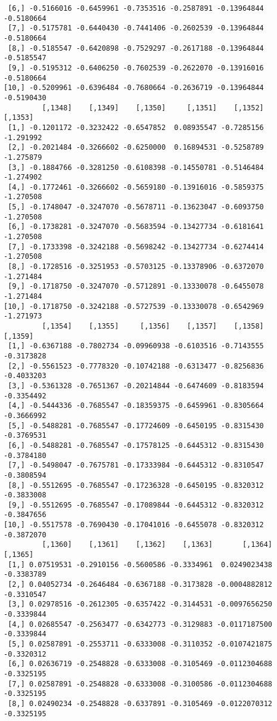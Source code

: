 \documentclass[
  letterpaper,
  DIV=11,
  numbers=noendperiod]{scrreprt}
\begin{document}
\begin{verbatim}
 [6,] -0.5166016 -0.6459961 -0.7353516 -0.2587891 -0.13964844 -0.5180664
 [7,] -0.5175781 -0.6440430 -0.7441406 -0.2602539 -0.13964844 -0.5180664
 [8,] -0.5185547 -0.6420898 -0.7529297 -0.2617188 -0.13964844 -0.5185547
 [9,] -0.5195312 -0.6406250 -0.7602539 -0.2622070 -0.13916016 -0.5180664
[10,] -0.5209961 -0.6396484 -0.7680664 -0.2636719 -0.13964844 -0.5190430
         [,1348]    [,1349]    [,1350]     [,1351]    [,1352]   [,1353]
 [1,] -0.1201172 -0.3232422 -0.6547852  0.08935547 -0.7285156 -1.291992
 [2,] -0.2021484 -0.3266602 -0.6250000  0.16894531 -0.5258789 -1.275879
 [3,] -0.1884766 -0.3281250 -0.6108398 -0.14550781 -0.5146484 -1.274902
 [4,] -0.1772461 -0.3266602 -0.5659180 -0.13916016 -0.5859375 -1.270508
 [5,] -0.1748047 -0.3247070 -0.5678711 -0.13623047 -0.6093750 -1.270508
 [6,] -0.1738281 -0.3247070 -0.5683594 -0.13427734 -0.6181641 -1.270508
 [7,] -0.1733398 -0.3242188 -0.5698242 -0.13427734 -0.6274414 -1.270508
 [8,] -0.1728516 -0.3251953 -0.5703125 -0.13378906 -0.6372070 -1.271484
 [9,] -0.1718750 -0.3247070 -0.5712891 -0.13330078 -0.6455078 -1.271484
[10,] -0.1718750 -0.3242188 -0.5727539 -0.13330078 -0.6542969 -1.271973
         [,1354]    [,1355]     [,1356]    [,1357]    [,1358]    [,1359]
 [1,] -0.6367188 -0.7802734 -0.09960938 -0.6103516 -0.7143555 -0.3173828
 [2,] -0.5561523 -0.7778320 -0.10742188 -0.6313477 -0.8256836 -0.4033203
 [3,] -0.5361328 -0.7651367 -0.20214844 -0.6474609 -0.8183594 -0.3354492
 [4,] -0.5444336 -0.7685547 -0.18359375 -0.6459961 -0.8305664 -0.3666992
 [5,] -0.5488281 -0.7685547 -0.17724609 -0.6450195 -0.8315430 -0.3769531
 [6,] -0.5488281 -0.7685547 -0.17578125 -0.6445312 -0.8315430 -0.3784180
 [7,] -0.5498047 -0.7675781 -0.17333984 -0.6445312 -0.8310547 -0.3808594
 [8,] -0.5512695 -0.7685547 -0.17236328 -0.6450195 -0.8320312 -0.3833008
 [9,] -0.5512695 -0.7685547 -0.17089844 -0.6445312 -0.8320312 -0.3847656
[10,] -0.5517578 -0.7690430 -0.17041016 -0.6455078 -0.8320312 -0.3872070
         [,1360]    [,1361]    [,1362]    [,1363]       [,1364]    [,1365]
 [1,] 0.07519531 -0.2910156 -0.5600586 -0.3334961  0.0249023438 -0.3383789
 [2,] 0.04052734 -0.2646484 -0.6367188 -0.3173828 -0.0004882812 -0.3310547
 [3,] 0.02978516 -0.2612305 -0.6357422 -0.3144531 -0.0097656250 -0.3339844
 [4,] 0.02685547 -0.2563477 -0.6342773 -0.3129883 -0.0117187500 -0.3339844
 [5,] 0.02587891 -0.2553711 -0.6333008 -0.3110352 -0.0107421875 -0.3320312
 [6,] 0.02636719 -0.2548828 -0.6333008 -0.3105469 -0.0112304688 -0.3325195
 [7,] 0.02587891 -0.2548828 -0.6333008 -0.3100586 -0.0112304688 -0.3325195
 [8,] 0.02490234 -0.2548828 -0.6337891 -0.3105469 -0.0122070312 -0.3325195

\end{verbatim}
\end{document}
